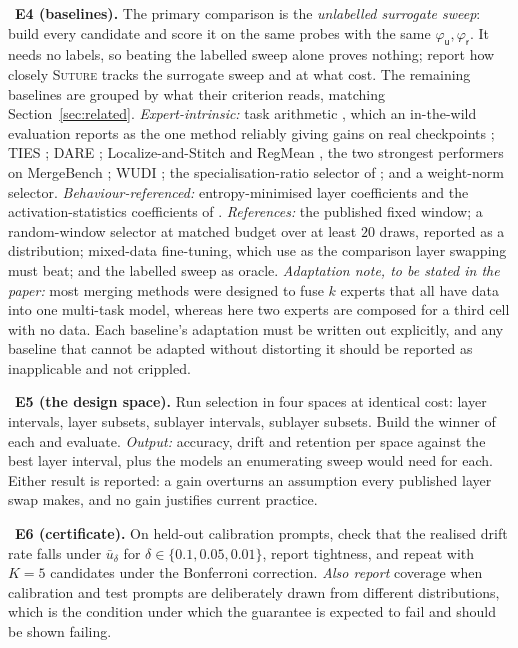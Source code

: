 \documentclass[10pt]{article}
\theoremstyle{plain}
\theoremstyle{definition}
\theoremstyle{remark}
\DeclareRobustCommand{\TORUN}[1]{\par\vspace{2pt}\noindent{\color{resred}\texttt{>>> TO RUN:}}\ #1\par\vspace{2pt}}
\newcommand{\util}{\mathsf{u}}
\newcommand{\risk}{\mathsf{r}}
\begin{document}
\TORUN{\textbf{E4 (baselines).} The primary comparison is the \emph{unlabelled
surrogate sweep}: build every candidate and score it on the same probes with the
same $\varphi_\util,\varphi_\risk$. It needs no labels, so beating the labelled
sweep alone proves nothing; report how closely \textsc{Suture} tracks the
surrogate sweep and at what cost. The remaining baselines are grouped by what
their criterion reads, matching Section~\ref{sec:related}.
\emph{Expert-intrinsic:} task arithmetic \citep{ilharco2023task}, which an
in-the-wild evaluation reports as the one method reliably giving gains on real
checkpoints \citep{hitit2026inthewild}; TIES \citep{yadav2023ties}; DARE
\citep{yu2024dare}; Localize-and-Stitch \citep{he2024localize} and RegMean
\citep{jin2023regmean}, the two strongest performers on MergeBench
\citep{he2025mergebench}; WUDI \citep{cheng2025wudi}; the specialisation-ratio
selector of \citet{shin2026safetyswap}; and a weight-norm selector.
\emph{Behaviour-referenced:} entropy-minimised layer coefficients
\citep{yang2024adamerging} and the activation-statistics coefficients of
\citet{acm2025}. \emph{References:} the published fixed window; a random-window
selector at matched budget over at least $20$ draws, reported as a distribution;
mixed-data fine-tuning, which \citet{bandarkar2025layerswap} use as the
comparison layer swapping must beat; and the labelled sweep as oracle.
\emph{Adaptation note, to be stated in the paper:} most merging methods were
designed to fuse $k$ experts that all have data into one multi-task model,
whereas here two experts are composed for a third cell with no data. Each
baseline's adaptation must be written out explicitly, and any baseline that
cannot be adapted without distorting it should be reported as inapplicable
and not crippled.}

\TORUN{\textbf{E5 (the design space).} Run selection in four spaces at identical
cost: layer intervals, layer subsets, sublayer intervals, sublayer subsets.
Build the winner of each and evaluate. \emph{Output:} accuracy, drift and
retention per space against the best layer interval, plus the models an
enumerating sweep would need for each. Either result is reported: a gain
overturns an assumption every published layer swap makes, and no gain justifies
current practice.}

\TORUN{\textbf{E6 (certificate).} On held-out calibration prompts, check that the
realised drift rate falls under $\bar{u}_\delta$ for
$\delta\in\{0.1,0.05,0.01\}$, report tightness, and repeat with $K=5$ candidates
under the Bonferroni correction. \emph{Also report} coverage when calibration and
test prompts are deliberately drawn from different distributions, which is the
condition under which the guarantee is expected to fail and should be shown
failing.}
\end{document}
